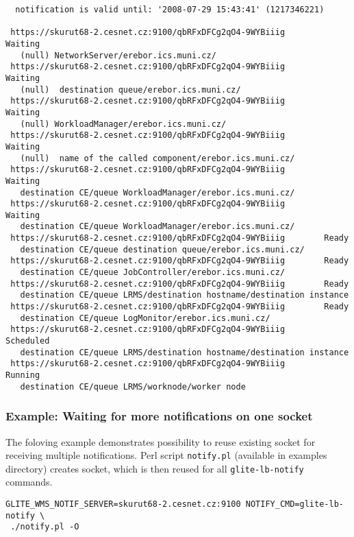 \begin{verbatim}
  notification is valid until: '2008-07-29 15:43:41' (1217346221)

 https://skurut68-2.cesnet.cz:9100/qbRFxDFCg2qO4-9WYBiiig        Waiting
   (null) NetworkServer/erebor.ics.muni.cz/
 https://skurut68-2.cesnet.cz:9100/qbRFxDFCg2qO4-9WYBiiig        Waiting
   (null)  destination queue/erebor.ics.muni.cz/
 https://skurut68-2.cesnet.cz:9100/qbRFxDFCg2qO4-9WYBiiig        Waiting
   (null) WorkloadManager/erebor.ics.muni.cz/
 https://skurut68-2.cesnet.cz:9100/qbRFxDFCg2qO4-9WYBiiig        Waiting
   (null)  name of the called component/erebor.ics.muni.cz/
 https://skurut68-2.cesnet.cz:9100/qbRFxDFCg2qO4-9WYBiiig        Waiting
   destination CE/queue WorkloadManager/erebor.ics.muni.cz/
 https://skurut68-2.cesnet.cz:9100/qbRFxDFCg2qO4-9WYBiiig        Waiting
   destination CE/queue WorkloadManager/erebor.ics.muni.cz/
 https://skurut68-2.cesnet.cz:9100/qbRFxDFCg2qO4-9WYBiiig        Ready
   destination CE/queue destination queue/erebor.ics.muni.cz/
 https://skurut68-2.cesnet.cz:9100/qbRFxDFCg2qO4-9WYBiiig        Ready
   destination CE/queue JobController/erebor.ics.muni.cz/
 https://skurut68-2.cesnet.cz:9100/qbRFxDFCg2qO4-9WYBiiig        Ready
   destination CE/queue LRMS/destination hostname/destination instance
 https://skurut68-2.cesnet.cz:9100/qbRFxDFCg2qO4-9WYBiiig        Ready
   destination CE/queue LogMonitor/erebor.ics.muni.cz/
 https://skurut68-2.cesnet.cz:9100/qbRFxDFCg2qO4-9WYBiiig        Scheduled
   destination CE/queue LRMS/destination hostname/destination instance
 https://skurut68-2.cesnet.cz:9100/qbRFxDFCg2qO4-9WYBiiig        Running
   destination CE/queue LRMS/worknode/worker node

\end{verbatim}


\subsubsection{Example: Waiting for more notifications on one socket}

The foloving example demonstrates possibility to reuse existing socket for receiving
multiple notifications. Perl script \verb'notify.pl' (available in 
examples directory) creates socket, which is then reused for all
\verb'glite-lb-notify' commands.

\begin{verbatim}
GLITE_WMS_NOTIF_SERVER=skurut68-2.cesnet.cz:9100 NOTIFY_CMD=glite-lb-notify \
 ./notify.pl -O
\end{verbatim}

